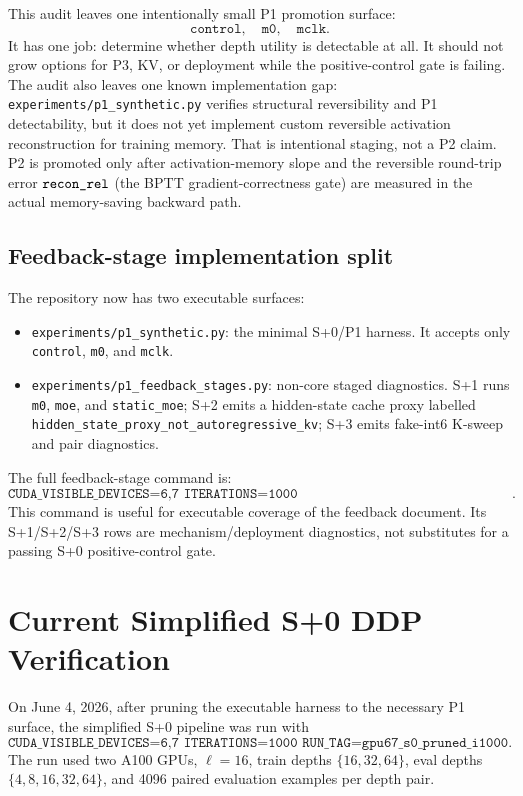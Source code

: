 \documentclass[11pt]{article}
\newcommand{\code}[1]{\texttt{#1}}
\begin{document}
This audit leaves one intentionally small P1 promotion surface:
\[
  \code{control},\quad \code{m0},\quad \code{mclk}.
\]
It has one job: determine whether depth utility is detectable at all.  It should not grow options
for P3, KV, or deployment while the positive-control gate is failing.  The audit also leaves one known
implementation gap: \code{experiments/p1\_synthetic.py} verifies
structural reversibility and P1 detectability, but it does not yet implement custom reversible
activation reconstruction for training memory.  That is intentional staging, not a P2 claim.  P2 is
promoted only after activation-memory slope and the reversible round-trip error
\(\code{\detokenize{recon_rel}}\) (the BPTT gradient-correctness gate) are measured in the actual
memory-saving backward path.

\subsection{Feedback-stage implementation split}

The repository now has two executable surfaces:
\begin{itemize}[leftmargin=1.4em,itemsep=2pt]
  \item \code{experiments/p1\_synthetic.py}: the minimal S+0/P1 harness.  It accepts only
  \code{control}, \code{m0}, and \code{mclk}.
  \item \code{experiments/p1\_feedback\_stages.py}: non-core staged diagnostics.  S+1 runs
  \code{m0}, \code{moe}, and \code{static\_moe}; S+2 emits a hidden-state cache proxy labelled
  \code{hidden\_state\_proxy\_not\_autoregressive\_kv}; S+3 emits fake-int6 K-sweep and pair
  diagnostics.
\end{itemize}
The full feedback-stage command is:
\[
\code{CUDA\_VISIBLE\_DEVICES=6,7\ ITERATIONS=1000\ RUN\_TAG=gpu67\_feedback\_all\_i1000\ bash\ experiments/run\_feedback\_stage\_pipeline.sh}.
\]
This command is useful for executable coverage of the feedback document.  Its S+1/S+2/S+3 rows are
mechanism/deployment diagnostics, not substitutes for a passing S+0 positive-control gate.

\section{Current Simplified S+0 DDP Verification}
\label{sec:s0-smoke}

On June 4, 2026, after pruning the executable harness to the necessary P1 surface, the simplified
S+0 pipeline was run with
\[
\code{CUDA\_VISIBLE\_DEVICES=6,7\ ITERATIONS=1000\ RUN\_TAG=gpu67\_s0\_pruned\_i1000}.
\]
The run used two A100 GPUs, \(\ell=16\), train depths \(\{16,32,64\}\), eval depths
\(\{4,8,16,32,64\}\), and 4096 paired evaluation examples per depth pair.
\end{document}

